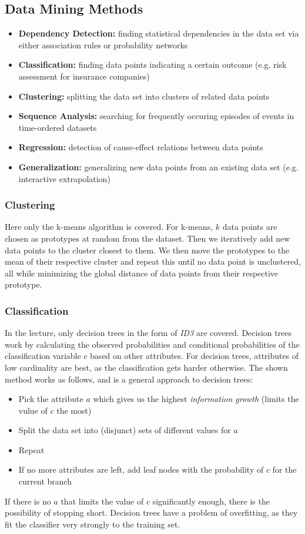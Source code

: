 \documentclass{article}
\begin{document}
\subsection{Data Mining Methods}
\begin{itemize}
    \item \textbf{Dependency Detection:} finding statistical dependencies in the data set via either association rules or probability networks
    \item \textbf{Classification:} finding data points indicating a certain outcome (e.g. risk assessment for insurance companies)
    \item \textbf{Clustering:} splitting the data set into clusters of related data points
    \item \textbf{Sequence Analysis:} searching for frequently occuring episodes of events in time-ordered datasets
    \item \textbf{Regression:} detection of cause-effect relations between data points
    \item \textbf{Generalization:} generalizing new data points from an existing data set (e.g. interactive extrapolation)
\end{itemize}

\subsubsection{Clustering}
Here only the k-means algorithm is covered.
For k-means, $k$ data points are chosen as prototypes at random from the dataset.
Then we iteratively add new data points to the cluster closest to them.
We then move the prototypes to the mean of their respective cluster and repeat this until no data point is unclustered, all while minimizing the global distance of data points from their respective prototype.

\subsubsection{Classification}
In the lecture, only decision trees in the form of \textit{ID3} are covered.
Decision trees work by calculating the observed probabilities and conditional probabilities of the classification variable $c$ based on other attributes.
For decision trees, attributes of low cardinality are best, as the classification gets harder otherwise.
The shown method works as follows, and is a general approach to decision trees:
\begin{itemize}
    \item Pick the attribute $a$ which gives us the highest \textit{information growth} (limits the vulue of $c$ the most)
    \item Split the data set into (disjunct) sets of different values for $a$
    \item Repeat
    \item If no more attributes are left, add leaf nodes with the probability of $c$ for the current branch
\end{itemize}
If there is no $a$ that limits the value of $c$ significantly enough, there is the possibility of stopping short.
Decision trees have a problem of overfitting, as they fit the classifier very strongly to the training set.
\end{document}
